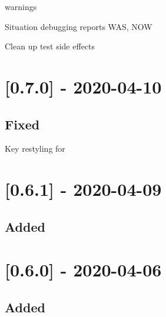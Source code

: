 \begin{shortlist}
    \item {} warnings
    \item Situation debugging reports WAS, NOW
    \item Clean up test side effects
\end{shortlist}

\section{[0.7.0] - 2020-04-10}

\subsection{Fixed}

\begin{shortlist}
    \item Key restyling for 
\end{shortlist}

\section{[0.6.1] - 2020-04-09}

\subsection{Added}

\begin{shortlist}
    \item {}
    \item {}
    \item {}
\end{shortlist}

\section{[0.6.0] - 2020-04-06}

\subsection{Added}

\begin{shortlist}
    \item {}
    \item {}
    \item {}
    \item {}
    \item {}
\end{shortlist}

